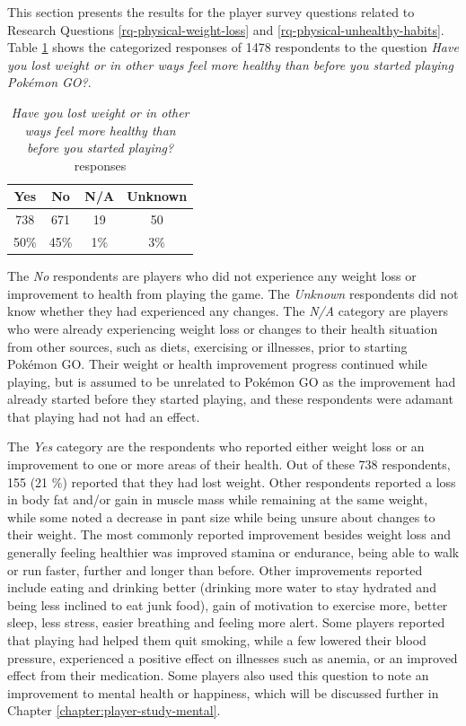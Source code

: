 This section presents the results for the player survey questions related to Research Questions \ref{rq-physical-weight-loss} and \ref{rq-physical-unhealthy-habits}. Table \ref{tbl:lost-weight-or-feeling-healthier} shows the categorized responses of 1478 respondents to the question \emph{Have you lost weight or in other ways feel more healthy than before you started playing Pokémon GO?}.

\begin{table}[h]
	\centering
	\caption{\emph{Have you lost weight or in other ways feel more healthy than before you started playing?} responses}
	\label{tbl:lost-weight-or-feeling-healthier}
	\begin{tabular}{|c|c|c|c|}
		\hline
		\textbf{Yes}	& \textbf{No}	& \textbf{N/A}	& \textbf{Unknown}\\
		\hline\hline
		738		& 671	& 19	& 50\\
		50\%	& 45\%	& 1\%	& 3\%\\\hline
	\end{tabular}
\end{table}

The \emph{No} respondents are players who did not experience any weight loss or improvement to health from playing the game. The \emph{Unknown} respondents did not know whether they had experienced any changes. The \emph{N/A} category are players who were already experiencing weight loss or changes to their health situation from other sources, such as diets, exercising or illnesses, prior to starting Pokémon GO. Their weight or health improvement progress continued while playing, but is assumed to be unrelated to Pokémon GO as the improvement had already started before they started playing, and these respondents were adamant that playing had not had an effect.

The \emph{Yes} category are the respondents who reported either weight loss or an improvement to one or more areas of their health. Out of these 738 respondents, 155 (21 \%) reported that they had lost weight. Other respondents reported a loss in body fat and/or gain in muscle mass while remaining at the same weight, while some noted a decrease in pant size while being unsure about changes to their weight. The most commonly reported improvement besides weight loss and generally feeling healthier was improved stamina or endurance, being able to walk or run faster, further and longer than before. Other improvements reported include eating and drinking better (drinking more water to stay hydrated and being less inclined to eat junk food), gain of motivation to exercise more, better sleep, less stress, easier breathing and feeling more alert. Some players reported that playing had helped them quit smoking, while a few lowered their blood pressure, experienced a positive effect on illnesses such as anemia, or an improved effect from their medication. Some players also used this question to note an improvement to mental health or happiness, which will be discussed further in Chapter \ref{chapter:player-study-mental}.


